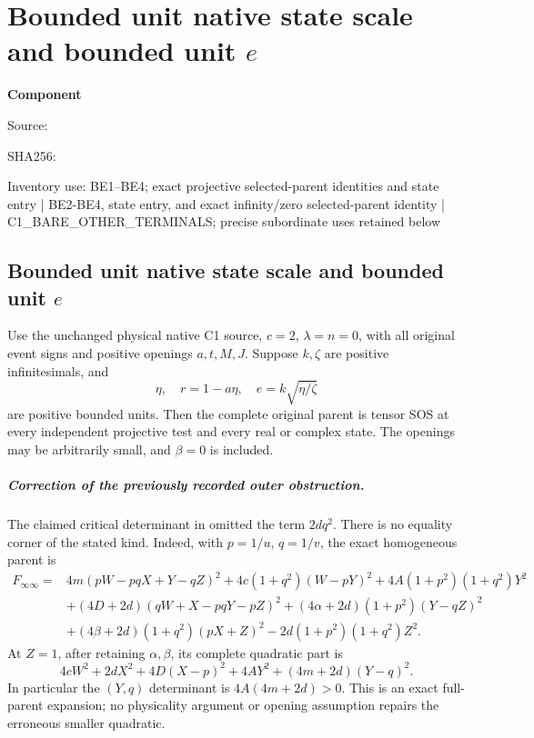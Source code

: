 \chapter{Bounded unit native state scale and bounded unit $e$}
\label{component:p69995d829bb2}
\noindent\textbf{Component }\par
{\small\noindent Source: \par}
{\small\noindent SHA256: \par}
{\small\noindent Inventory use: BE1--BE4; exact projective selected-parent identities and state entry | BE2-BE4, state entry, and exact infinity/zero selected-parent identity | C1\_\allowbreak{}BARE\_\allowbreak{}OTHER\_\allowbreak{}TERMINALS; precise subordinate uses retained below\par}
\medskip
\section[Bounded unit native state scale and bounded unit e]{Bounded unit native state scale and bounded unit $e$}

\begin{theorem}
Use the unchanged physical native C1 source, $c=2$, $\lambda=n=0$,
with all original event signs and positive openings $a,t,M,J$.
Suppose $k,\zeta$ are positive infinitesimals, and
\[
 \eta,\quad r=1-a\eta,\quad e=k\sqrt{\eta/\zeta}
\]
are positive bounded units. Then the complete original parent is tensor
SOS at every independent projective test and every real or complex state.
The openings may be arbitrarily small, and $\beta=0$ is included.
\end{theorem}

\paragraph{Correction of the previously recorded outer obstruction.}
The claimed critical determinant in 
omitted the term $2dq^2$. There is no equality corner of the stated kind.
Indeed, with $p=1/u$, $q=1/v$, the exact homogeneous parent is
\begin{align*}
F_{\infty\infty}={}&4m(pW-pqX+Y-qZ)^2
 +4c(1+q^2)(W-pY)^2+4A(1+p^2)(1+q^2)Y^2\\
&+(4D+2d)(qW+X-pqY-pZ)^2
 +(4\alpha+2d)(1+p^2)(Y-qZ)^2\\
&+(4\beta+2d)(1+q^2)(pX+Z)^2
 -2d(1+p^2)(1+q^2)Z^2.
\end{align*}
At $Z=1$, after retaining $\alpha,\beta$, its complete quadratic part is
\[
 4cW^2+2dX^2+4D(X-p)^2+4AY^2+(4m+2d)(Y-q)^2.
 \tag{BE1}
\]
In particular the $(Y,q)$ determinant is $4A(4m+2d)>0$.
This is an exact full-parent expansion; no physicality argument or
opening assumption repairs the erroneous smaller quadratic.

